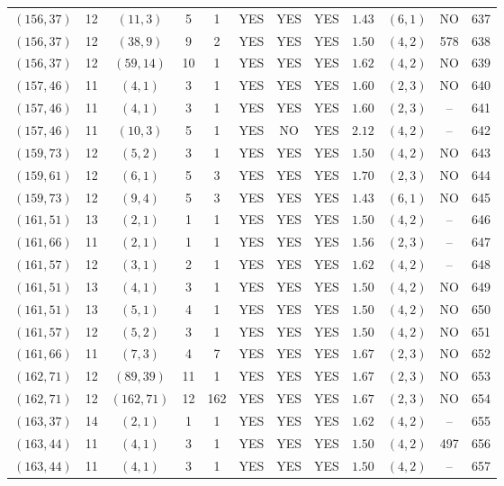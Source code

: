 \begin{longtable}{|c|c|c|c|c|c|c|c|c|c|c|c|}
$(156,37)$ & 12 & $(11,3)$ & 5 & 1 & YES & YES & YES & $1.43$ & $(6,1)$ & NO & 637\\
$(156,37)$ & 12 & $(38,9)$ & 9 & 2 & YES & YES & YES & $1.50$ & $(4,2)$ & 578 & 638\\
$(156,37)$ & 12 & $(59,14)$ & 10 & 1 & YES & YES & YES & $1.62$ & $(4,2)$ & NO & 639\\
$(157,46)$ & 11 & $(4,1)$ & 3 & 1 & YES & YES & YES & $1.60$ & $(2,3)$ & NO & 640\\
$(157,46)$ & 11 & $(4,1)$ & 3 & 1 & YES & YES & YES & $1.60$ & $(2,3)$ & -- & 641\\
$(157,46)$ & 11 & $(10,3)$ & 5 & 1 & YES & NO & YES & $2.12$ & $(4,2)$ & -- & 642\\
$(159,73)$ & 12 & $(5,2)$ & 3 & 1 & YES & YES & YES & $1.50$ & $(4,2)$ & NO & 643\\
$(159,61)$ & 12 & $(6,1)$ & 5 & 3 & YES & YES & YES & $1.70$ & $(2,3)$ & NO & 644\\
$(159,73)$ & 12 & $(9,4)$ & 5 & 3 & YES & YES & YES & $1.43$ & $(6,1)$ & NO & 645\\
$(161,51)$ & 13 & $(2,1)$ & 1 & 1 & YES & YES & YES & $1.50$ & $(4,2)$ & -- & 646\\
$(161,66)$ & 11 & $(2,1)$ & 1 & 1 & YES & YES & YES & $1.56$ & $(2,3)$ & -- & 647\\
$(161,57)$ & 12 & $(3,1)$ & 2 & 1 & YES & YES & YES & $1.62$ & $(4,2)$ & -- & 648\\
$(161,51)$ & 13 & $(4,1)$ & 3 & 1 & YES & YES & YES & $1.50$ & $(4,2)$ & NO & 649\\
$(161,51)$ & 13 & $(5,1)$ & 4 & 1 & YES & YES & YES & $1.50$ & $(4,2)$ & NO & 650\\
$(161,57)$ & 12 & $(5,2)$ & 3 & 1 & YES & YES & YES & $1.50$ & $(4,2)$ & NO & 651\\
$(161,66)$ & 11 & $(7,3)$ & 4 & 7 & YES & YES & YES & $1.67$ & $(2,3)$ & NO & 652\\
$(162,71)$ & 12 & $(89,39)$ & 11 & 1 & YES & YES & YES & $1.67$ & $(2,3)$ & NO & 653\\
$(162,71)$ & 12 & $(162,71)$ & 12 & 162 & YES & YES & YES & $1.67$ & $(2,3)$ & NO & 654\\
$(163,37)$ & 14 & $(2,1)$ & 1 & 1 & YES & YES & YES & $1.62$ & $(4,2)$ & -- & 655\\
$(163,44)$ & 11 & $(4,1)$ & 3 & 1 & YES & YES & YES & $1.50$ & $(4,2)$ & 497 & 656\\
$(163,44)$ & 11 & $(4,1)$ & 3 & 1 & YES & YES & YES & $1.50$ & $(4,2)$ & -- & 657\\

\end{longtable}
